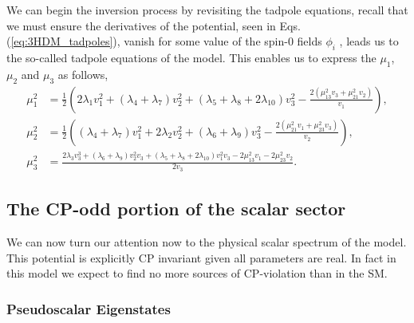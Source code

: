 We can begin the inversion process by revisiting the tadpole equations, recall that we must ensure the derivatives of the potential, seen in Eqs.\,(\ref{eq:3HDM_tadpoles}), vanish for some value of the spin-0 fields $\phi_i$ , leads us to the so-called tadpole equations of the model. This enables us to express the $\mu_1$, $\mu_2$ and $\mu_3$ as follows, 
%
\begin{equation}
\label{eq:3HDM_Param_1}
\begin{split}
%
\mu _1^2& =\frac{1}{2} \left(2 \lambda _1 v_1^2+\left(\lambda _4+\lambda _7\right) v_2^2+\left(\lambda _5+\lambda _8+2 \lambda _{10}\right) v_3^2-\frac{2 \left(\mu _{13}^2 v_3+\mu _{21}^2
   v_2\right)}{v_1}\right) , \\ 
%
\mu _2^2 & =\frac{1}{2} \left(\left(\lambda _4+\lambda _7\right) v_1^2+2 \lambda _2 v_2^2+\left(\lambda _6+\lambda _9\right) v_3^2-\frac{2 \left(\mu _{21}^2 v_1+\mu _{23}^2 v_3\right)}{v_2}\right)  , \\ 
% 
\mu _3^2 & =\frac{2 \lambda _3 v_3^3+\left(\lambda _6+\lambda _9\right) v_2^2 v_3+\left(\lambda _5+\lambda _8+2 \lambda _{10}\right) v_1^2 v_3-2 \mu _{13}^2 v_1-2 \mu _{23}^2 v_2}{2 v_3} . 
\end{split}  
\end{equation}

\subsection{The CP-odd portion of the scalar sector}

We can now turn our attention now to the physical scalar spectrum of the model. 
%
This potential is explicitly CP invariant given all parameters are real.
%
In fact in this model we expect to find no more sources of CP-violation than in the SM. 

\subsubsection{Pseudoscalar Eigenstates}

